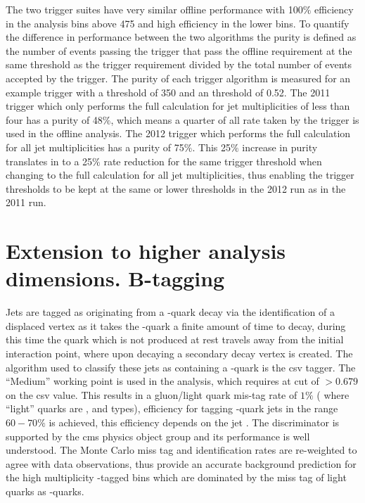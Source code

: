The two trigger suites have very similar offline performance with 100$\%$ 
efficiency in the analysis bins above \unit{475}{\GeV} and high efficiency in 
the lower bins. To quantify the difference in performance between the two 
algorithms the purity is defined as the number of events passing the trigger 
that pass the offline \alt requirement at the same threshold as the trigger requirement divided by the total number of events 
accepted by the trigger.
The purity of each trigger algorithm is measured for an example trigger with a 
\HT threshold of \unit{350}{\GeV} and an \alt threshold of 0.52.
The 2011 trigger which only performs the full \alt calculation for jet 
multiplicities of less than four has a purity of 48$\%$, which means a quarter 
of all rate taken by the trigger is used in the offline analysis.
The 2012 trigger which performs the full \alt calculation for all jet 
multiplicities has a purity of 75$\%$. This 25$\%$ increase in purity 
translates in to a 25$\%$ rate reduction for the same trigger threshold when
changing to the full \alt calculation for all jet multiplicities, thus enabling 
the trigger thresholds to be kept at the same or lower thresholds in the 2012 
run as in the 2011 run.


\section{Extension to higher analysis dimensions. B-tagging} %
\label{sec:extension_to_higher_analysis_dimensions_}

Jets are tagged as originating from a \Pbottom-quark decay via the 
identification of a displaced vertex as it takes the \Pbottom-quark a finite 
amount of time to decay, during this time the quark which is not produced at 
rest travels away from the initial interaction point, where upon decaying a 
secondary decay vertex is created. The algorithm used to classify these jets as 
containing a \Pbottom-quark is the \ac{csv} tagger. The ``Medium'' working 
point is used in the analysis, which requires at cut of $>0.679$ on the 
\ac{csv} value. This results in a gluon/light quark mis-tag rate of $1\%$ (
where ``light'' quarks are \Pup, \Pdown and \Pstrange types), efficiency for 
tagging \Pbottom-quark jets in the range $60-70\%$\cite{ref-b-tag-eff} is 
achieved, this efficiency depends on the jet \PT. The discriminator is 
supported by the \ac{cms} \Pbottom physics object group\cite{ref-b-pog-algo} 
and its performance is well understood. The Monte Carlo miss tag and 
identification rates are re-weighted to agree with data observations, thus 
provide an accurate background prediction for the high multiplicity 
\Pbottom-tagged bins which are dominated by the miss tag of light quarks as 
\Pbottom-quarks.



